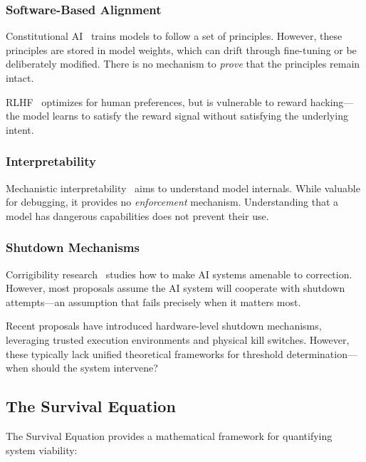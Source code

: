 \documentclass[11pt,a4paper]{article}
\begin{document}
\subsubsection{Software-Based Alignment}

Constitutional AI~\cite{bai2022constitutional} trains models to follow a set of principles.
However, these principles are stored in model weights, which can drift through fine-tuning or be deliberately modified.
There is no mechanism to \emph{prove} that the principles remain intact.

RLHF~\cite{christiano2017deep} optimizes for human preferences, but is vulnerable to reward hacking---the model learns to satisfy the reward signal without satisfying the underlying intent.

\subsubsection{Interpretability}

Mechanistic interpretability~\cite{elhage2022toy} aims to understand model internals.
While valuable for debugging, it provides no \emph{enforcement} mechanism.
Understanding that a model has dangerous capabilities does not prevent their use.

\subsubsection{Shutdown Mechanisms}

Corrigibility research~\cite{soares2015corrigibility} studies how to make AI systems amenable to correction.
However, most proposals assume the AI system will cooperate with shutdown attempts---an assumption that fails precisely when it matters most.

Recent proposals have introduced hardware-level shutdown mechanisms, leveraging trusted execution environments and physical kill switches.
However, these typically lack unified theoretical frameworks for threshold determination---when should the system intervene?

\subsection{The Survival Equation}

The Survival Equation provides a mathematical framework for quantifying system viability:
\end{document}
